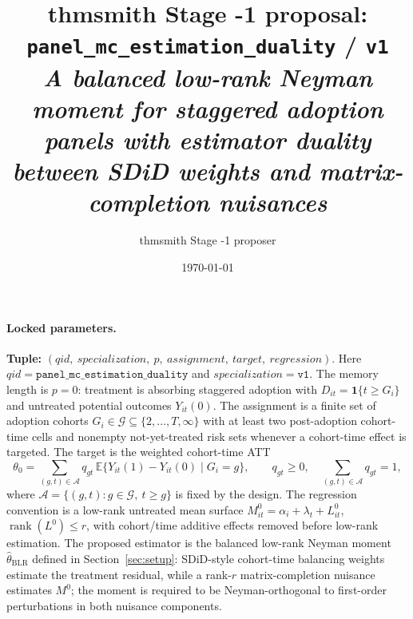 \documentclass[11pt]{article}
\title{thmsmith Stage -1 proposal: \texttt{panel\_mc\_estimation\_duality} / \texttt{v1}%
  \\ \large\textit{A balanced low-rank Neyman moment for staggered adoption panels with estimator duality between SDiD weights and matrix-completion nuisances}}
\author{thmsmith Stage -1 proposer}
\date{\today}
\newcommand{\E}{\mathbb{E}}
\newcommand{\one}{\mathbf{1}}
\theoremstyle{definition}
\theoremstyle{plain}
\theoremstyle{remark}
\begin{document}
\maketitle


\paragraph{Locked parameters.}
\textbf{Tuple:} $(qid,\ specialization,\ p,\ assignment,\ target,\ regression)$.
Here $qid=\texttt{panel\_mc\_estimation\_duality}$ and
$specialization=\texttt{v1}$. The memory length is $p=0$: treatment is
absorbing staggered adoption with $D_{it}=\one\{t\ge G_i\}$ and untreated
potential outcomes $Y_{it}(0)$. The assignment is a finite set of adoption
cohorts $G_i\in\mathcal G\subseteq\{2,\ldots,T,\infty\}$ with at least two
post-adoption cohort-time cells and nonempty not-yet-treated risk sets whenever
a cohort-time effect is targeted. The target is the weighted cohort-time ATT
\[
  \theta_0=\sum_{(g,t)\in\mathcal A} q_{gt}\,
  \E\{Y_{it}(1)-Y_{it}(0)\mid G_i=g\},
  \qquad q_{gt}\ge 0,\quad \sum_{(g,t)\in\mathcal A}q_{gt}=1,
\]
where $\mathcal A=\{(g,t):g\in\mathcal G,\ t\ge g\}$ is fixed by the design.
The regression convention is a low-rank untreated mean surface
$M^0_{it}=\alpha_i+\lambda_t+L^0_{it}$, $\operatorname{rank}(L^0)\le r$, with
cohort/time additive effects removed before low-rank estimation. The proposed
estimator is the balanced low-rank Neyman moment
$\widehat\theta_{\mathrm{BLR}}$ defined in Section~\ref{sec:setup}: SDiD-style
cohort-time balancing weights estimate the treatment residual, while a rank-$r$
matrix-completion nuisance estimates $M^0$; the moment is required to be
Neyman-orthogonal to first-order perturbations in both nuisance components.
\end{document}
